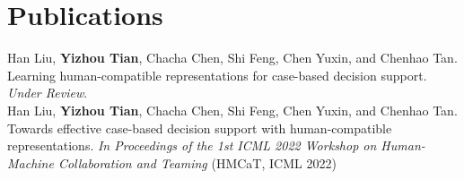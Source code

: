 \clearpage
\section{Publications}


Han Liu, \textbf{Yizhou Tian}, Chacha Chen, Shi Feng, Chen Yuxin, and Chenhao Tan. Learning human-compatible representations for case-based decision support. \textit{Under Review}. \\
   

\noindent Han Liu, \textbf{Yizhou Tian}, Chacha Chen, Shi Feng, Chen Yuxin, and Chenhao Tan. Towards effective case-based decision support with human-compatible representations. \textit{In Proceedings of the 1st ICML 2022 Workshop on Human-Machine Collaboration and Teaming} (HMCaT, ICML 2022) 
